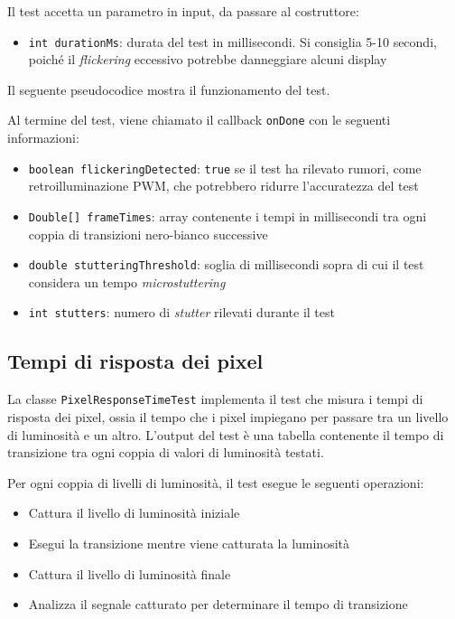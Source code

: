 Il test accetta un parametro in input, da passare al costruttore:\begin{itemize}
	\item \texttt{int durationMs}: durata del test in millisecondi. Si consiglia 5-10 secondi, poiché il \textit{flickering} eccessivo potrebbe danneggiare alcuni display
\end{itemize}

Il seguente pseudocodice mostra il funzionamento del test.


Al termine del test, viene chiamato il callback \texttt{onDone} con le seguenti informazioni:\begin{itemize}
	\item \texttt{boolean flickeringDetected}: \texttt{true} se il test ha rilevato rumori, come retroilluminazione PWM, che potrebbero ridurre l'accuratezza del test
	\item \texttt{Double[] frameTimes}: array contenente i tempi in millisecondi tra ogni coppia di transizioni nero-bianco successive
	\item \texttt{double stutteringThreshold}: soglia di millisecondi sopra di cui il test considera un tempo \textit{microstuttering}
	\item \texttt{int stutters}: numero di \textit{stutter} rilevati durante il test
\end{itemize}

\subsection{Tempi di risposta dei pixel}
La classe \texttt{PixelResponseTimeTest} implementa il test che misura i tempi di risposta dei pixel, ossia il tempo che i pixel impiegano per passare tra un livello di luminosità e un altro. L'output del test è una tabella contenente il tempo di transizione tra ogni coppia di valori di luminosità testati.

Per ogni coppia di livelli di luminosità, il test esegue le seguenti operazioni:\begin{itemize}
	\item Cattura il livello di luminosità iniziale
	\item Esegui la transizione mentre viene catturata la luminosità
	\item Cattura il livello di luminosità finale
	\item Analizza il segnale catturato per determinare il tempo di transizione
\end{itemize}

